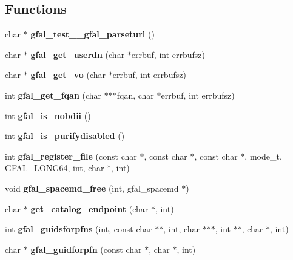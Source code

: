 \subsection*{Functions}
\begin{CompactItemize}
\item 
char $\ast$ \textbf{gfal\_\-test\_\-\_\-gfal\_\-parseturl} ()\label{group__internal__group_g9282bb70dffe20af2db91d05418ac9c5}

\item 
char $\ast$ \textbf{gfal\_\-get\_\-userdn} (char $\ast$errbuf, int errbufsz)\label{group__internal__group_g6bd6336b0fee1ff32ad6bc5ef3d96068}

\item 
char $\ast$ \textbf{gfal\_\-get\_\-vo} (char $\ast$errbuf, int errbufsz)\label{group__internal__group_g1d7294ee456d16c8b1bf40f97ffb5081}

\item 
int \textbf{gfal\_\-get\_\-fqan} (char $\ast$$\ast$$\ast$fqan, char $\ast$errbuf, int errbufsz)\label{group__internal__group_g54b4e29078838583c8022630ef5a2ed3}

\item 
int \textbf{gfal\_\-is\_\-nobdii} ()\label{group__internal__group_g0d2a0557bdb571ccb85c6ab5c05ae56f}

\item 
int \textbf{gfal\_\-is\_\-purifydisabled} ()\label{group__internal__group_g3a35f0e6f616c5108f95cfffd557db77}

\item 
int \textbf{gfal\_\-register\_\-file} (const char $\ast$, const char $\ast$, const char $\ast$, mode\_\-t, GFAL\_\-LONG64, int, char $\ast$, int)\label{group__internal__group_gdb09f20d086253b45c5d2896be95b4a9}

\item 
void \textbf{gfal\_\-spacemd\_\-free} (int, gfal\_\-spacemd $\ast$)\label{group__internal__group_gb22308fb1cfbade81dddfcf4bedf86da}

\item 
char $\ast$ \textbf{get\_\-catalog\_\-endpoint} (char $\ast$, int)\label{group__internal__group_gb3b834ff96e3d42df0404a02a9f8d1f5}

\item 
int \textbf{gfal\_\-guidsforpfns} (int, const char $\ast$$\ast$, int, char $\ast$$\ast$$\ast$, int $\ast$$\ast$, char $\ast$, int)\label{group__internal__group_g72f2d9fb6a55816f243a4c57c5369fe5}

\item 
char $\ast$ \textbf{gfal\_\-guidforpfn} (const char $\ast$, char $\ast$, int)\label{group__internal__group_g86568afb8c7f9b0d6944de793a3e867a}


\end{CompactItemize}
